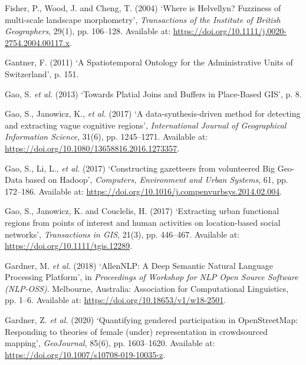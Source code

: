 \documentclass[
  letterpaper,
  11pt,
  english,
  onehalfspacing,
  headsepline]{MastersDoctoralThesis}
\newlength{\cslhangindent}
\newlength{\cslentryspacingunit} %
\newenvironment{CSLReferences}[2] %
 {%
  \setlength{\parindent}{0pt}
  \ifodd #1
  \let\oldpar\par
  \def\par{\hangindent=\cslhangindent\oldpar}
  \fi
  \setlength{\parskip}{#2\cslentryspacingunit}
 }%
 {}
\begin{document}
\begin{CSLReferences}{0}{0}
\leavevmode{}%
Fisher, P., Wood, J. and Cheng, T. (2004) {`Where is {Helvellyn}?
{Fuzziness} of multi-scale landscape morphometry'}, \emph{Transactions
of the Institute of British Geographers}, 29(1), pp. 106--128. Available
at: \url{https://doi.org/10.1111/j.0020-2754.2004.00117.x}.

\leavevmode{}%
Gantner, F. (2011) {`A {Spatiotemporal Ontology} for the {Administrative
Units} of {Switzerland}'}, p. 151.

\leavevmode{}%
Gao, S. \emph{et al.} (2013) {`Towards {Platial Joins} and {Buffers} in
{Place-Based GIS}'}, p. 8.

\leavevmode{}%
Gao, S., Janowicz, K., \emph{et al.} (2017) {`A data-synthesis-driven
method for detecting and extracting vague cognitive regions'},
\emph{International Journal of Geographical Information Science}, 31(6),
pp. 1245--1271. Available at:
\url{https://doi.org/10.1080/13658816.2016.1273357}.

\leavevmode{}%
Gao, S., Li, L., \emph{et al.} (2017) {`Constructing gazetteers from
volunteered {Big Geo-Data} based on {Hadoop}'}, \emph{Computers,
Environment and Urban Systems}, 61, pp. 172--186. Available at:
\url{https://doi.org/10.1016/j.compenvurbsys.2014.02.004}.

\leavevmode{}%
Gao, S., Janowicz, K. and Couclelis, H. (2017) {`Extracting urban
functional regions from points of interest and human activities on
location-based social networks'}, \emph{Transactions in GIS}, 21(3), pp.
446--467. Available at: \url{https://doi.org/10.1111/tgis.12289}.

\leavevmode{}%
Gardner, M. \emph{et al.} (2018) {`{AllenNLP}: {A Deep Semantic Natural
Language Processing Platform}'}, in \emph{Proceedings of {Workshop} for
{NLP Open Source Software} ({NLP-OSS})}. {Melbourne, Australia}:
{Association for Computational Linguistics}, pp. 1--6. Available at:
\url{https://doi.org/10.18653/v1/w18-2501}.

\leavevmode{}%
Gardner, Z. \emph{et al.} (2020) {`Quantifying gendered participation in
{OpenStreetMap}: Responding to theories of female (under) representation
in crowdsourced mapping'}, \emph{GeoJournal}, 85(6), pp. 1603--1620.
Available at: \url{https://doi.org/10.1007/s10708-019-10035-z}.


\end{CSLReferences}
\end{document}
